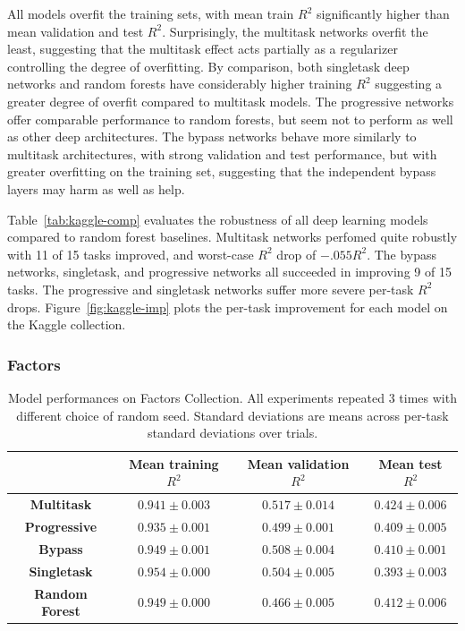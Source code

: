 All models overfit the training sets, with mean train $R^2$ significantly higher than mean validation and test $R^2$. Surprisingly, the multitask networks overfit the least, suggesting that the multitask effect acts partially as a regularizer controlling the degree of overfitting. By comparison, both singletask deep networks and random forests have considerably higher training $R^2$ suggesting a greater degree of overfit compared to multitask models. The progressive networks offer comparable performance to random forests, but seem not to perform as well as other deep architectures. The bypass networks behave more similarly to multitask architectures, with strong validation and test performance, but with greater overfitting on the training set, suggesting that the independent bypass layers may harm as well as help.

Table~\ref{tab:kaggle-comp} evaluates the robustness of all deep learning models compared to random forest baselines. Multitask networks perfomed quite robustly with 11 of 15 tasks improved, and worst-case $R^2$ drop of $-.055 R^2$. The bypass networks, singletask, and progressive networks all succeeded in improving 9 of 15 tasks. The progressive and singletask networks suffer more severe per-task $R^2$ drops. Figure~\ref{fig:kaggle-imp} plots the per-task improvement for each model on the Kaggle collection. 

\subsubsection{Factors}
\begin{table}[H]
    \centering
    \begin{tabular}{ |c|c|c|c| } 
    \hline
     & Mean training $R^2$ & Mean validation $R^2$ & Mean test $R^2$ \\
    \hline
    \textbf{Multitask} & $0.941 \pm 0.003$ & $0.517 \pm 0.014$ & $0.424 \pm 0.006$ \\
    \hline
    \textbf{Progressive} & $0.935 \pm 0.001$ & $0.499 \pm 0.001$ & $0.409 \pm 0.005$  \\
    \hline
    \textbf{Bypass} & $0.949 \pm 0.001$ & $0.508 \pm 0.004$ & $0.410 \pm 0.001$ \\
    \hline
    \textbf{Singletask} & $0.954 \pm 0.000$ & $0.504 \pm 0.005$ & $0.393 \pm 0.003$  \\
    \hline
    \textbf{Random Forest} & $0.949 \pm 0.000$ & $0.466 \pm 0.005$ & $0.412 \pm 0.006$ \\
    \hline
    \end{tabular}
    \caption{Model performances on Factors Collection. All experiments repeated 3 times with different choice of random seed. Standard deviations are means across per-task standard deviations over trials.}
    \label{tab:factors}
\end{table}

